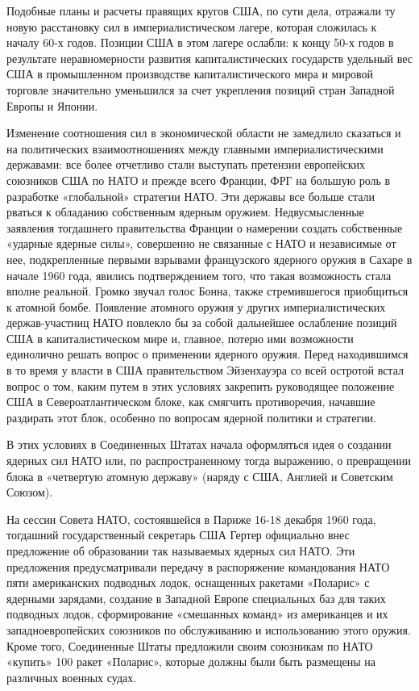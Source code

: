 \documentclass[12pt, a4paper, openany]{book}
\begin{document}
	Подобные планы и расчеты правящих кругов США, по сути дела, отражали ту новую расстановку сил в империалистическом лагере, которая сложилась к началу 60-х годов. Позиции США в этом лагере ослабли: к концу 50-х годов в результате неравномерности развития капиталистических государств удельный вес США в промышленном производстве капиталистического мира и мировой торговле значительно уменьшился за счет укрепления позиций стран Западной Европы и Японии.
	
	Изменение соотношения сил в экономической области не замедлило сказаться и на политических взаимоотношениях между главными империалистическими державами: все более отчетливо стали выступать претензии европейских союзников США по НАТО и прежде всего Франции, ФРГ на большую роль в разработке «глобальной» стратегии НАТО. Эти державы все больше стали рваться к обладанию собственным ядерным оружием. Недвусмысленные заявления тогдашнего правительства Франции о намерении создать собственные «ударные ядерные силы», совершенно не связанные с НАТО и независимые от нее, подкрепленные первыми взрывами французского ядерного оружия в Сахаре в начале 1960 года, явились подтверждением того, что такая возможность стала вполне реальной. Громко звучал голос Бонна, также стремившегося приобщиться к атомной бомбе. Появление атомного оружия у других империалистических держав-участниц НАТО повлекло бы за собой дальнейшее ослабление позиций США в капиталистическом мире и, главное, потерю ими возможности единолично решать вопрос о применении ядерного оружия. Перед находившимся в то время у власти в США правительством Эйзенхауэра со всей остротой встал вопрос о том, каким путем в этих условиях закрепить руководящее положение США в Североатлантическом блоке, как смягчить противоречия, начавшие раздирать этот блок, особенно по вопросам ядерной политики и стратегии.
	
	В этих условиях в Соединенных Штатах начала оформляться идея о создании ядерных сил НАТО или, по распространенному тогда выражению, о превращении блока в «четвертую атомную державу» (наряду с США, Англией и Советским Союзом).
	
	На сессии Совета НАТО, состоявшейся в Париже 16-18 декабря 1960 года, тогдашний государственный секретарь США Гертер официально внес предложение об образовании так называемых ядерных сил НАТО. Эти предложения предусматривали передачу в распоряжение командования НАТО пяти американских подводных лодок, оснащенных ракетами «Поларис» с ядерными зарядами, создание в Западной Европе специальных баз для таких подводных лодок, сформирование «смешанных команд» из американцев и их западноевропейских союзников по обслуживанию и использованию этого оружия. Кроме того, Соединенные Штаты предложили своим союзникам по НАТО «купить» 100 ракет «Поларис», которые должны были быть размещены на различных военных судах.
	
\end{document}
